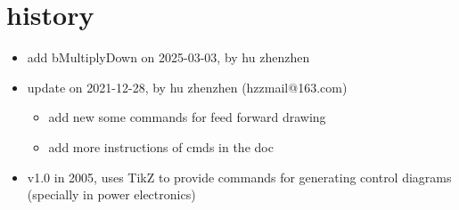 \documentclass[a4paper,onecolumn]{IEEETran}
\begin{document}
\clearpage

\section{history}

\begin{itemize}
  \item  add bMultiplyDown on 2025-03-03, by hu zhenzhen

  \item  update on 2021-12-28, by hu zhenzhen (hzzmail@163.com)
    \begin{itemize}
    \item add new some commands for feed forward drawing
    \item add more instructions of cmds in the doc
    \end{itemize}

  \item v1.0 in 2005, uses TikZ to provide commands for generating control diagrams (specially in power electronics)
\end{itemize}
\end{document}

